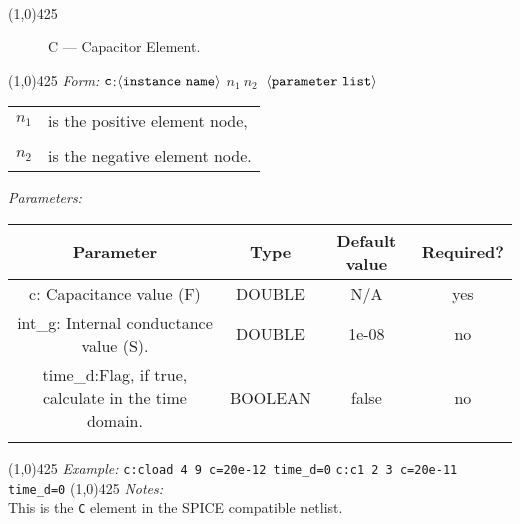 \documentclass{article}
\begin{document}
\\
\hrulefill\linethickness{0.5mm}\line(1,0){425}
\normalsize
\newline
\begin{figure}[h]
\centerline{\epsfxsize=1in} \caption{C ---
Capacitor Element.}
\end{figure}
\newline
\linethickness{0.5mm} \line(1,0){425}
\newline
\textit{Form:}
$\tt c$:$\langle \tt{instance\ name}\rangle$ $n_1\ n_2\ $ $\langle
\tt{parameter\ list}\rangle$
\newline
\begin{tabular}{r l}
$n_1$ & is the positive element node, \\
&  \\
$n_2$ & is the negative element node. \\
\end{tabular}
\newline
\textit{Parameters:}
\begin{table}[H]
\begin{tabular}{|c|c|c|c|}
\hline
Parameter&Type&Default value&Required?\\
\hline
c: Capacitance value (F)& DOUBLE & N/A & yes\\
\hline
int\_g: Internal conductance value (S). & DOUBLE & 1e-08 & no\\
\hline
time\_d:Flag, if true, calculate in the time domain. & BOOLEAN & false & no\\
\par
\hline
\end{tabular}
\end{table}
\noindent\linethickness{0.5mm}\line(1,0){425}
\newline
\textit{Example:}
\newline
\texttt{c:cload\ 4\ 9\ c=20e-12 time\_d=0}
\newline
\texttt{c:c1\ 2\ 3\ c=20e-11 time\_d=0}
\newline
\linethickness{0.5mm} \line(1,0){425}
\newline
\textit{Notes:}\\
This is the \texttt{C} element in the SPICE compatible netlist.\\
\end{document}
